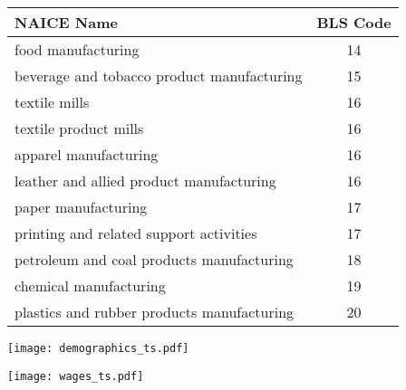 \documentclass[11pt]{article}
\begin{document}
\begin{center}
\begin{tabular}{lc} \toprule
NAICE Name                                  & BLS Code \\ \midrule
food manufacturing                          &  14      \\
beverage and tobacco product manufacturing  &  15      \\
textile mills                               &  16      \\
textile product mills                       &  16      \\
apparel manufacturing                       &  16      \\
leather and allied product manufacturing    &  16      \\
paper manufacturing                         &  17      \\
printing and related support activities     &  17      \\
petroleum and coal products manufacturing   &  18      \\
chemical manufacturing                      &  19      \\
plastics and rubber products manufacturing  &  20      \\
\end{tabular}
\end{center}

\begin{center}
  \noindent \texttt{[image: demographics\_ts.pdf]}
  \label{fig:demographics_ts}
\end{center}

\begin{center}
  \noindent \texttt{[image: wages\_ts.pdf]}
  \label{fig:earnings_ts}
\end{center}
\end{document}
